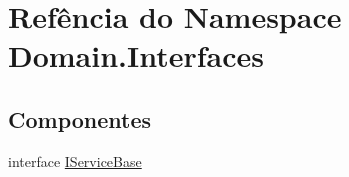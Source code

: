 \hypertarget{namespaceDomain_1_1Interfaces}{}\section{Refência do Namespace Domain.\+Interfaces}
\label{namespaceDomain_1_1Interfaces}
\subsection*{Componentes}
\begin{DoxyCompactItemize}
\item 
interface \hyperlink{interfaceDomain_1_1Interfaces_1_1IServiceBase}{I\+Service\+Base}
\end{DoxyCompactItemize}
